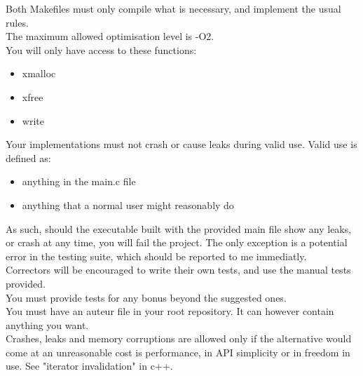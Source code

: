 \documentclass{42-en}
\begin{document}
    Both Makefiles must only compile what is necessary, and implement the usual rules.\\

    The maximum allowed optimisation level is -O2.\\

    You will only have access to these functions:\\
    \begin{itemize}\itemsep7pt
        \item xmalloc
        \item xfree
        \item write
    \end{itemize}
    

    Your implementations must not crash or cause leaks during valid use. Valid use is defined as:
    \begin{itemize}\itemsep7pt
        \item anything in the main.c file
        \item anything that a normal user might reasonably do
    \end{itemize}

    As such, should the executable built with the provided main file show any leaks,
    or crash at any time, you will fail the project. The only exception is a potential
    error in the testing suite, which should be reported to me immediatly.\\

    Correctors will be encouraged to write their own tests, and use the manual tests provided.\\

    You must provide tests for any bonus beyond the suggested ones.\\

    You must have an auteur file in your root repository. It can however contain anything you want.\\

    Crashes, leaks and memory corruptions are allowed only if the alternative would come at
    an unreasonable cost is performance, in API simplicity or in freedom in use. See "iterator
    invalidation" in c++.\\
    
\end{document}
